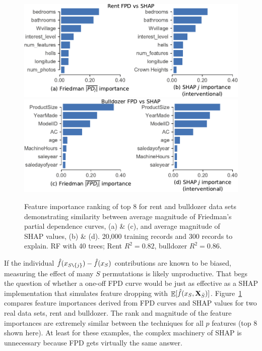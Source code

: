 \documentclass[11pt]{article}
\newcommand{\figref}[1]{Figure~\ref{#1}}
\DeclareMathOperator{\Ex}{\mathbb{E}}
\begin{document}
\begin{figure}[htbp]
\begin{center}
\includegraphics[scale=0.53]{images/rent-pdp-vs-shap.pdf}\includegraphics[scale=0.53]{images/bulldozer-pdp-vs-shap.pdf}
\caption[short]{\small  Feature importance ranking of top 8 for rent and bulldozer data sets demonstrating similarity between average magnitude of Friedman's partial dependence curves, (a) \& (c), and average magnitude of SHAP values, (b) \& (d). 20,000 training records and 300 records to explain. RF with 40 trees; Rent $R^2 = 0.82$, bulldozer $R^2 = 0.86$.}
\label{fig:FPD_vs_SHAP}
\end{center}
\end{figure}

If the individual $\hat{f}(x_{S \texttt{\char`\\} \{j\}}) - \hat{f}(x_{S})$ contributions are known to be biased, measuring the effect of many $S$ permutations is likely unproductive. That begs the question of whether a one-off FPD curve would be just as effective as a SHAP implementation that  simulates feature dropping with $\Ex[\hat{f}(x_{S},{\bf X}_{\bar{S}})]$.  \figref{fig:FPD_vs_SHAP} compares feature importances derived from FPD curves and SHAP values for two real data sets, rent and bulldozer. The rank and magnitude of the feature importances are extremely similar between the techniques for all $p$ features (top 8 shown here). At least for these examples, the complex machinery of SHAP is unnecessary because FPD gets virtually the same answer.
\end{document}
